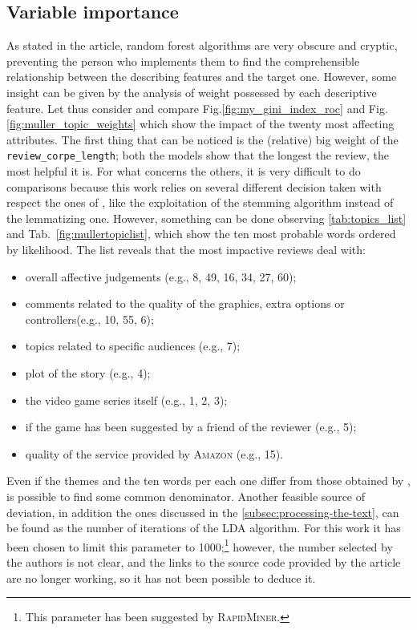 \documentclass[a4paper]{article}
\begin{document}
		\subsection{Variable importance}
			As stated in the article, random forest algorithms are very obscure and cryptic, preventing the person who implements them to find the comprehensible relationship between the describing features and the target one. However, some insight can be given by the analysis of weight possessed by each descriptive feature. Let thus consider and compare Fig.\autoref{fig:my_gini_index_roc} and Fig.\autoref{fig:muller_topic_weights} which show the impact of the twenty most affecting attributes. The first thing that can be noticed is the (relative) big weight of the \verb*|review_corpe_length|; both the models show that the longest the review, the most helpful it is. For what concerns the others, it is very difficult to do comparisons because this work relies on several different decision taken with respect the ones of \cite{article:muller}, like the exploitation of the stemming algorithm instead of the lemmatizing one. However, something can be done observing \autoref{tab:topics_list} and Tab.~\ref{fig:mullertopiclist}, which show the ten most probable words ordered by likelihood. The list reveals that the most impactive reviews deal with:
			\begin{itemize}
				\item overall affective judgements (e.g., 8, 49, 16, 34, 27, 60);
				\item comments related to the quality of the graphics, extra options or controllers(e.g., 10, 55, 6);
				\item topics related to specific audiences (e.g., 7);
				\item plot of the story (e.g., 4);
				\item the video game series itself (e.g., 1, 2, 3);
				\item if the game has been suggested by a friend of the reviewer (e.g., 5);
				\item quality of the service provided by \textsc{Amazon} (e.g., 15).
			\end{itemize}
		
			Even if the themes and the ten words per each one differ from those obtained by \autocite{article:muller}, is possible to find some common denominator. Another feasible source of deviation, in addition the ones discussed in the \autoref{subsec:processing-the-text}, can be found as the number of iterations of the LDA algorithm. For this work it has been chosen to limit this parameter to 1000;\footnote{This parameter has been suggested by \textsc{RapidMiner}.} however, the number selected by the authors is not clear, and the links to the source code provided by the article are no longer working, so it has not been possible to deduce it.
			
\end{document}
